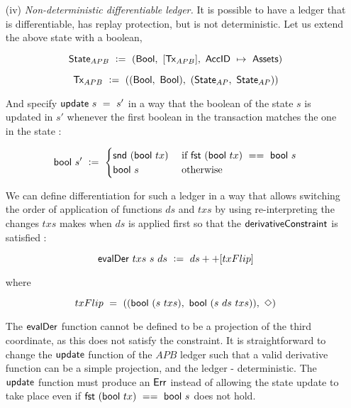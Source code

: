 \begin{itemize}
  \item[(iv)] \emph{Non-deterministic differentiable ledger.} It is possible to have a ledger
  that is differentiable, has replay protection, but is not deterministic. Let us
  extend the above state with a boolean,

  \[ \mathsf{State}_{APB}~\mathrel{\mathop:}=~(\mathsf{Bool},~[\mathsf{Tx}_{APB}],~\mathsf{AccID}~\mapsto~\mathsf{Assets}) \]

  \[ \mathsf{Tx}_{APB}~\mathrel{\mathop:}=~((\mathsf{Bool},~\mathsf{Bool}),~(\mathsf{State}_{AP},~\mathsf{State}_{AP})) \]

  And specify $\mathsf{update}~s~=~s'$ in a way that the boolean of the state $s$ is updated in $s'$ whenever
  the first boolean in the transaction matches the one in the state :

  \[ \mathsf{bool}~s' ~\mathrel{\mathop:}=~ \begin{cases}
     \mathsf{snd}~(\mathsf{bool}~tx) & \text{ if } \mathsf{fst}~(\mathsf{bool}~tx)~==~\mathsf{bool}~s \\
     \mathsf{bool}~s & \text{ otherwise}
  \end{cases} \]

  We can define differentiation for such a ledger in a way that allows switching the order of application
  of functions $ds$ and $txs$ by using re-interpreting the changes $txs$ makes when $ds$ is applied
  first so that the $\mathsf{derivativeConstraint}$ is satisfied :

    \[\mathsf{evalDer} ~txs ~s~ ds ~\mathrel{\mathop:}=~ ds++ [txFlip] \]

    where

    \[ txFlip~=~((\mathsf{bool}~(s~txs),~\mathsf{bool}~(s~ds~txs)),~\Diamond) \]

    The $\mathsf{evalDer}$ function cannot be defined to be a projection of the third
    coordinate, as this does not satisfy the constraint. It is straightforward to change the $\mathsf{update}$
    function of the $APB$ ledger
    such that a valid derivative function can be a simple projection, and the ledger - deterministic. The $\mathsf{update}$ function must
    produce an $\mathsf{Err}$ instead of
    allowing the state update to take place even if $\mathsf{fst}~(\mathsf{bool}~tx)~==~\mathsf{bool}~s$ does not hold.


\end{itemize}
